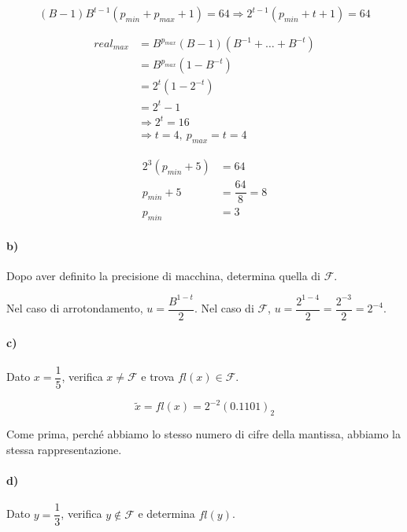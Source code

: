 \begin{equation*}
  (B-1)B^{t-1}(p_{min}+p_{max}+1)=64 \Rightarrow 2^{t-1}(p_{min}+t+1)=64
\end{equation*}

\begin{equation*}
\begin{split}
  real_{max}  &= B^{p_{max}}(B-1)(B^{-1}+\ldots +B^{-t})\\
              &= B^{p_{max}}(1-B^{-t})\\
              &= 2^t(1-2^{-t})\\
              &= 2^t-1\\
  &\Rightarrow 2^t = 16\\
  &\Rightarrow t =4,~ p_{max}=t=4
\end{split}
\end{equation*}

\begin{equation*}
\begin{split}
  2^3(p_{min}+5) &=64\\
  p_{min} +5 &= \dfrac{64}{8} = 8\\
  p_{min} &= 3
\end{split}
\end{equation*}


\paragraph{b)} Dopo aver definito la precisione di macchina, determina quella di $\mathcal{F}$.\medskip

Nel caso di arrotondamento, $u=\dfrac{B^{1-t}}{2}$. Nel caso di $\mathcal{F}$, $u=\dfrac{2^{1-4}}{2}=\dfrac{2^{-3}}{2}=2^{-4}$.


\paragraph{c)} Dato $x=\dfrac{1}{5}$, verifica $x\neq \mathcal{F}$ e trova $fl(x)\in \mathcal{F}$.

\begin{equation*}
  \tilde{x}=fl(x)=2^{-2}(0.1101)_2
\end{equation*}

Come prima, perché abbiamo lo stesso numero di cifre della mantissa, abbiamo la stessa rappresentazione.

\paragraph{d)} Dato $y=\dfrac{1}{3}$, verifica $y\not\in \mathcal{F}$ e determina $fl(y)$.\medskip

